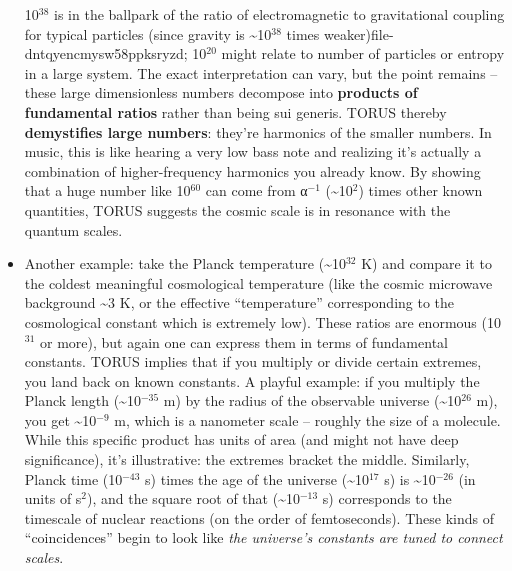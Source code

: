 \documentclass[]{article}
\newcommand{\superscript}[1]{\ensuremath{^{\mathrm{#1}}}}
\begin{document}
\begin{itemize}
  10\superscript{38} is in the ballpark of the ratio of electromagnetic to
  gravitational coupling for typical particles (since gravity is
  \textasciitilde{}10\superscript{38} times weaker)​file-dntqyencmysw58ppksryzd;
  10\superscript{20} might relate to number of particles or entropy in a large
  system. The exact interpretation can vary, but the point remains --
  these large dimensionless numbers decompose into \textbf{products of
  fundamental ratios} rather than being sui generis. TORUS thereby
  \textbf{demystifies large numbers}: they're harmonics of the smaller
  numbers. In music, this is like hearing a very low bass note and
  realizing it's actually a combination of higher-frequency harmonics
  you already know. By showing that a huge number like 10\superscript{60} can come
  from α\superscript{−1} (\textasciitilde{}10\superscript{2}) times other known quantities,
  TORUS suggests the cosmic scale is in resonance with the quantum
  scales​.
\item
  Another example: take the Planck temperature
  (\textasciitilde{}10\superscript{32} K) and compare it to the coldest meaningful
  cosmological temperature (like the cosmic microwave background
  \textasciitilde{}3 K, or the effective ``temperature'' corresponding
  to the cosmological constant which is extremely low). These ratios are
  enormous (10\superscript{31} or more), but again one can express them in terms
  of fundamental constants. TORUS implies that if you multiply or divide
  certain extremes, you land back on known constants. A playful example:
  if you multiply the Planck length (\textasciitilde{}10\superscript{−35} m) by
  the radius of the observable universe (\textasciitilde{}10\superscript{26} m),
  you get \textasciitilde{}10\superscript{−9} m, which is a nanometer scale --
  roughly the size of a molecule. While this specific product has units
  of area (and might not have deep significance), it's illustrative: the
  extremes bracket the middle. Similarly, Planck time (10\superscript{−43} s)
  times the age of the universe (\textasciitilde{}10\superscript{17} s) is
  \textasciitilde{}10\superscript{−26} (in units of s\superscript{2}), and the square root
  of that (\textasciitilde{}10\superscript{−13} s) corresponds to the timescale of
  nuclear reactions (on the order of femtoseconds). These kinds of
  ``coincidences'' begin to look like \emph{the universe's constants are
  tuned to connect scales}.
\end{itemize}
\end{document}
